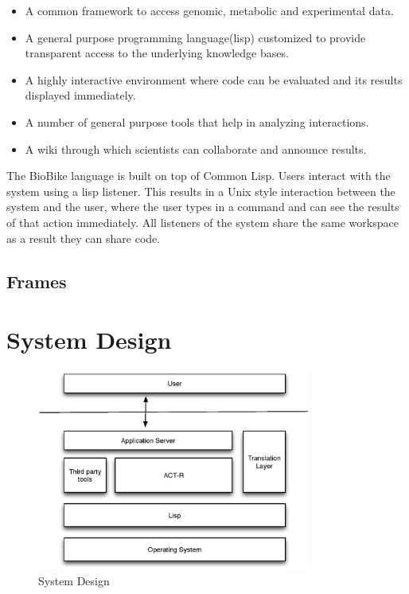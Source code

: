 \begin{itemize}
\item A common framework to access genomic, metabolic and experimental data.
\item A general purpose programming language(lisp) customized to
  provide transparent access to the underlying knowledge bases.
\item A highly interactive environment where code can be evaluated and
  its results displayed immediately.
\item A number of general purpose tools that help in analyzing interactions.
\item A wiki through which scientists can collaborate and announce results.
\end{itemize}

The BioBike language is built on top of Common Lisp. Users interact
with the system using a lisp listener. This results in a Unix style
interaction between the system and the user, where the user types in a
command and can see the results of that action immediately. All
listeners of the system share the same workspace as a result they can
share code.


\subsection{Frames}

\section{System Design}

\begin{figure}[htp]
  \centering
  \includegraphics[width=90mm]{SystemOverview.eps}
  \caption{System Design}
  \label{SysOverview}
\end{figure}


